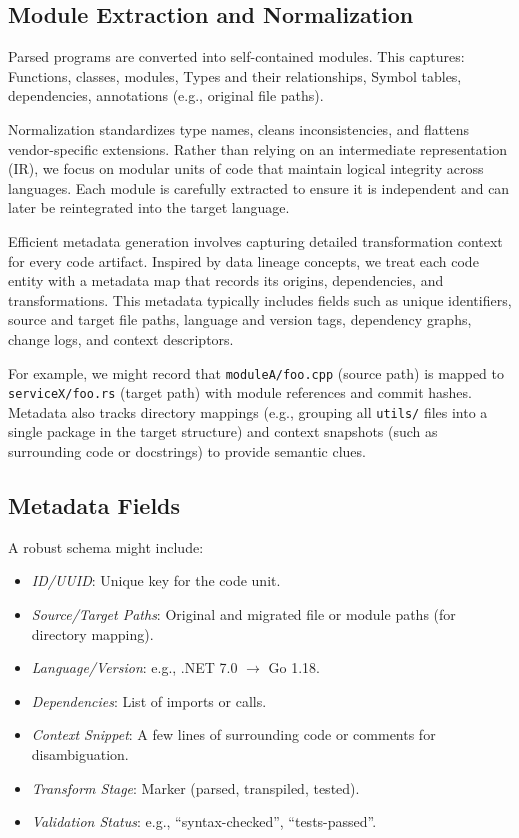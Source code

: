 \documentclass[twocolumn]{article}
\begin{document}
\subsection{Module Extraction and Normalization}

Parsed programs are converted into self-contained modules. This captures:
Functions, classes, modules,
Types and their relationships, 
Symbol tables, dependencies, annotations (e.g., original file paths).

Normalization standardizes type names, cleans inconsistencies, and flattens vendor-specific extensions. Rather than relying on an intermediate representation (IR), we focus on modular units of code that maintain logical integrity across languages. Each module is carefully extracted to ensure it is independent and can later be reintegrated into the target language.

Efficient metadata generation involves capturing detailed transformation context for every code artifact. Inspired by data lineage concepts, we treat each code entity with a metadata map that records its origins, dependencies, and transformations. This metadata typically includes fields such as unique identifiers, source and target file paths, language and version tags, dependency graphs, change logs, and context descriptors. 

For example, we might record that \texttt{moduleA/foo.cpp} (source path) is mapped to \texttt{serviceX/foo.rs} (target path) with module references and commit hashes. Metadata also tracks directory mappings (e.g., grouping all \texttt{utils/} files into a single package in the target structure) and context snapshots (such as surrounding code or docstrings) to provide semantic clues.

\subsection*{Metadata Fields}

A robust schema might include:

\begin{itemize}
    \item \textit{ID/UUID}: Unique key for the code unit.
    \item \textit{Source/Target Paths}: Original and migrated file or module paths (for directory mapping).
    \item \textit{Language/Version}: e.g., .NET 7.0 $\rightarrow$ Go 1.18.
    \item \textit{Dependencies}: List of imports or calls.
    \item \textit{Context Snippet}: A few lines of surrounding code or comments for disambiguation.
    \item \textit{Transform Stage}: Marker (parsed, transpiled, tested).
    \item \textit{Validation Status}: e.g., ``syntax-checked'', ``tests-passed''.
\end{itemize}
\end{document}
